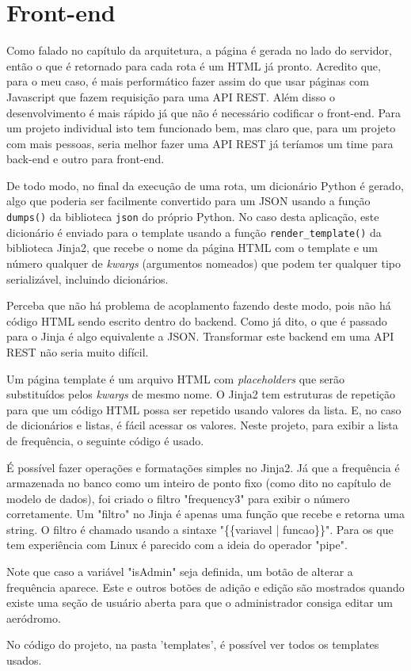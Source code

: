 \chapter{Front-end}

Como falado no capítulo da arquitetura, a página é gerada no lado do servidor, então o que 
é retornado para cada rota é um HTML já pronto. Acredito que, para o meu caso, é mais 
performático fazer assim do que usar páginas com Javascript que fazem requisição para uma API REST.
Além disso o desenvolvimento é mais rápido já que não é necessário codificar o front-end.
Para um projeto individual isto tem funcionado bem, mas claro que, para um projeto com
mais pessoas, seria melhor fazer uma API REST já teríamos um time para back-end e outro
para front-end.

De todo modo, no final da execução de uma rota, um dicionário Python é gerado, algo que 
poderia ser facilmente convertido para um JSON usando a função \texttt{dumps()} da 
biblioteca \texttt{json} do próprio Python. No caso desta aplicação, este dicionário é 
enviado para o template usando a função \texttt{render\_template()} da biblioteca Jinja2, 
que recebe o nome da página HTML com o template e um número qualquer de \textit{kwargs} (argumentos nomeados) 
que podem ter qualquer tipo serializável, incluindo dicionários.

Perceba que não há problema de acoplamento fazendo deste modo, pois não há código HTML sendo 
escrito dentro do backend. Como já dito, o que é passado para o Jinja é algo equivalente a JSON.
Transformar este backend em uma API REST não seria muito difícil.

Um página template é um arquivo HTML com \textit{placeholders} que serão substituídos pelos 
\textit{kwargs} de mesmo nome. O Jinja2 tem estruturas de repetição para que um código HTML 
possa ser repetido usando valores da lista. E, no caso de dicionários e listas, é fácil acessar 
os valores. Neste projeto, para exibir a lista de frequência, o seguinte código é usado.



É possível fazer operações e formatações simples no Jinja2. Já que a frequência 
é armazenada no banco como um inteiro de ponto fixo (como dito no capítulo de modelo de dados), 
foi criado o filtro "frequency3" para exibir o número corretamente. Um "filtro" no Jinja 
é apenas uma função que recebe e retorna
uma string. O filtro é chamado usando a sintaxe "\{\{variavel | funcao\}\}". Para os que tem
experiência com Linux é parecido com a ideia do operador "pipe".


Note que caso a variável "isAdmin" seja definida, um botão de alterar a frequência aparece. Este
e outros botões de adição e edição são mostrados quando existe uma seção de usuário aberta para que o administrador
consiga editar um aeródromo.

No código do projeto, na pasta 'templates', é possível ver todos os templates usados.

